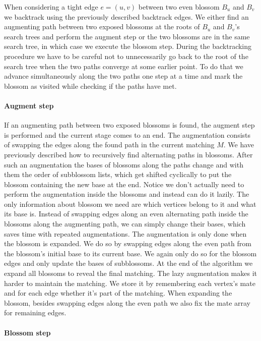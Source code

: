 When considering a tight edge $e=(u, v)$ between two even blossom $B_u$ and $B_v$ we backtrack using the previously described backtrack edges. We either find an augmenting path between two exposed blossoms at the roots of $B_u$ and $B_v$'s search trees and perform the augment step or the two blossoms are in the same search tree, in which case we execute the blossom step. During the backtracking procedure we have to be careful not to unnecessarily go back to the root of the search tree when the two paths converge at some earlier point. To do that we advance simultaneously along the two paths one step at a time and mark the blossom as visited while checking if the paths have met.

\paragraph*{Augment step}

If an augmenting path between two exposed blossoms is found, the augment step is performed and the current stage comes to an end. The augmentation consists of swapping the edges along the found path in the current matching $M$. We have previously described how to recursively find alternating paths in blossoms. After such an augmentation the bases of blossoms along the paths change and with them the order of subblossom lists, which get shifted cyclically to put the blossom containing the new base at the end. 
Notice we don't actually need to perform the augmentation inside the blossoms and instead can do it lazily. The only information about blossom we need are which vertices belong to it and what its base is. Instead of swapping edges along an even alternating path inside the blossoms along the augmenting path, we can simply change their bases, which saves time with repeated augmentations. The augmentation is only done when the blossom is expanded. We do so by swapping edges along the even path from the blossom's initial base to its current base. We again only do so for the blossom edges and only update the bases of subblossoms. At the end of the algorithm we expand all blossoms to reveal the final matching. The lazy augmentation makes it harder to maintain the matching. We store it by remembering each vertex's mate and for each edge whether it's part of the matching. When expanding the blossom, besides swapping edges along the even path we also fix the mate array for remaining edges.

\paragraph*{Blossom step}

